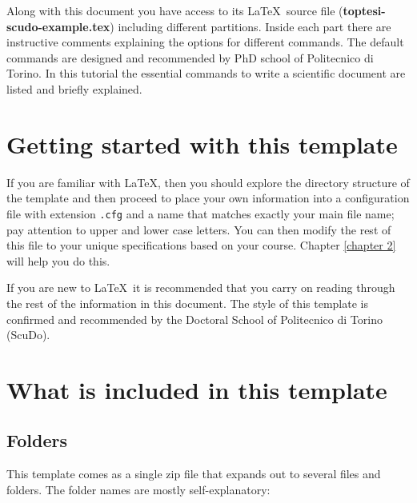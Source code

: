 Along with this document you have access to its \LaTeX\ source file (\textbf{toptesi-scudo-example.tex}) including different partitions. Inside each part there are instructive comments explaining the options for different commands. The default commands are designed and recommended by PhD school of Politecnico di Torino. In this tutorial the  essential commands to write a scientific document are listed and briefly explained.  




\section{Getting started with this template}  %
\label{section1.2}
If you are familiar with \LaTeX, then you should explore the directory structure of the template and then proceed to place your own information into a configuration file with extension \texttt{.cfg} and a name that matches exactly your main file name; pay attention to upper and lower case letters. You can then modify the rest of this file to your unique specifications based on your course. Chapter \ref{chapter 2} will help you do this.

If you are new to \LaTeX\ it is recommended that you carry on reading through the rest of the information in this document. The style of this template is confirmed and recommended by the Doctoral School of Politecnico di Torino (ScuDo).

\section{What is included in this template}
\label{section 1.3}

\subsection{Folders}

This template comes as a single zip file that expands out to several files and folders. The folder names are mostly self-explanatory:

